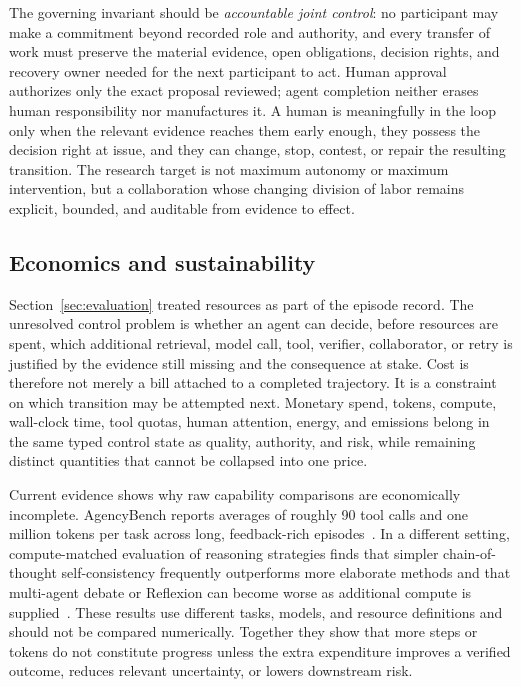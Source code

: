The governing invariant should be \emph{accountable joint control}: no participant may make a commitment beyond recorded role and authority, and every transfer of work must preserve the material evidence, open obligations, decision rights, and recovery owner needed for the next participant to act. Human approval authorizes only the exact proposal reviewed; agent completion neither erases human responsibility nor manufactures it. A human is meaningfully in the loop only when the relevant evidence reaches them early enough, they possess the decision right at issue, and they can change, stop, contest, or repair the resulting transition. The research target is not maximum autonomy or maximum intervention, but a collaboration whose changing division of labor remains explicit, bounded, and auditable from evidence to effect.

\subsection{Economics and sustainability}

Section~\ref{sec:evaluation} treated resources as part of the episode record. The unresolved control problem is whether an agent can decide, before resources are spent, which additional retrieval, model call, tool, verifier, collaborator, or retry is justified by the evidence still missing and the consequence at stake. Cost is therefore not merely a bill attached to a completed trajectory. It is a constraint on which transition may be attempted next. Monetary spend, tokens, compute, wall-clock time, tool quotas, human attention, energy, and emissions belong in the same typed control state as quality, authority, and risk, while remaining distinct quantities that cannot be collapsed into one price.

Current evidence shows why raw capability comparisons are economically incomplete. AgencyBench reports averages of roughly 90 tool calls and one million tokens per task across long, feedback-rich episodes~\cite{li2026agencybench}. In a different setting, compute-matched evaluation of reasoning strategies finds that simpler chain-of-thought self-consistency frequently outperforms more elaborate methods and that multi-agent debate or Reflexion can become worse as additional compute is supplied~\cite{wang2024tokeneconomies}. These results use different tasks, models, and resource definitions and should not be compared numerically. Together they show that more steps or tokens do not constitute progress unless the extra expenditure improves a verified outcome, reduces relevant uncertainty, or lowers downstream risk.

